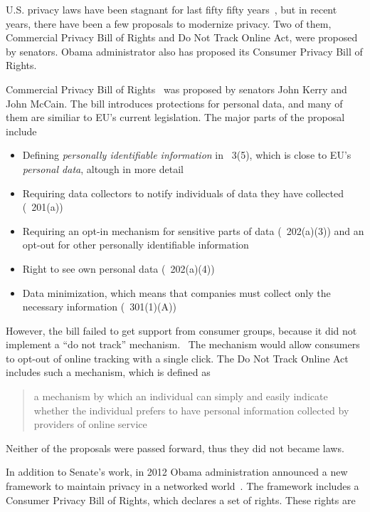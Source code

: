 \documentclass[12pt,a4paper,oneside,pdftex]{report}
\begin{document}
U.S. privacy laws have been stagnant for last fifty fifty years~\cite{richards2010prosser}, but in recent years, there have been a few proposals to modernize privacy. Two of them, Commercial Privacy Bill of Rights and Do Not Track Online Act, were proposed by senators. Obama administrator also has proposed its Consumer Privacy Bill of Rights.

Commercial Privacy Bill of Rights~\cite{com_pbr} was proposed by senators John Kerry and John McCain. The bill introduces protections for personal data, and  many of them are similiar to EU's current legislation. The major parts of the proposal include

\begin{itemize}
    \item Defining \emph{personally identifiable information} in \textsection~3(5), which is close to EU's \emph{personal data}, altough in more detail
    \item Requiring data collectors to notify individuals of data they have collected (\textsection~201(a))
    \item Requiring an opt-in mechanism for sensitive parts of data (\textsection~202(a)(3)) and an opt-out for other personally identifiable information
    \item Right to see own personal data (\textsection~202(a)(4))
    \item Data minimization, which means that companies must collect only the necessary information (\textsection~301(1)(A))
\end{itemize}

However, the bill failed to get support from consumer groups, because it did not implement a ``do not track'' mechanism.~\cite{jennings2012track} The mechanism would allow consumers to opt-out of online tracking with a single click. The Do Not Track Online Act~\cite{donottrack_act} includes such a mechanism, which is defined as

\begin{quote}
    a mechanism by which an individual can simply and easily indicate whether the individual prefers to have personal information collected by providers of online service
\end{quote}

Neither of the proposals were passed forward, thus they did not became laws.

In addition to Senate's work, in 2012 Obama administration announced a new framework to maintain privacy in a networked world~\cite{con_pbr}. The framework includes a Consumer Privacy Bill of Rights, which declares a set of rights. These rights are
\end{document}
